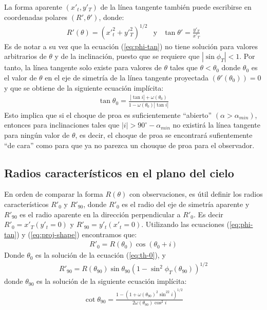La forma aparente $(x'_t, y'_T)$  de la línea tangente también puede escribirse
en coordenadas polares $(R', \theta')$, donde:
\begin{align}
  R'(\theta) = \left(x'_t^2 + y'_T^2\right)^{1/2} & \mathrm{y} & \tan\theta' = \frac{y'_T}{x'_T}
  \label{eq:polar}
\end{align}
Es de notar a su vez que la ecuación (\ref{eq:phi-tan}) no tiene solución para valores
arbitrarios de $\theta$ y de la inclinación, puesto que se requiere que
$\left|\sin\phi_T\right| < 1$. Por tanto, la línea tangente solo existe para valores
de $\theta$ tales que $\theta < \theta_0$ donde $\theta_0$ es el valor de $\theta$ en
el eje de simetría de la línea tangente proyectada $(\theta'(\theta_0)) = 0$ y que se
obtiene de la siguiente ecuación implícita:
\begin{align}
  \tan\theta_0 = \frac{|\tan i| + \omega(\theta_0)}{1 - \omega(\theta_0)|\tan i|}
  \label{eq:th-0}
\end{align}
Esto implica que si el choque de proa es suficientemente ``abierto''
$(\alpha > \alpha_{min})$, entonces para inclinaciones tales que
$|i| > 90^\circ - \alpha_{min}$ no existirá la línea tangente para ningún valor de $\theta$,
es decir, el choque de proa se encontrará sufientemente ``de cara'' como para que ya no
parezca un chouque de proa para el observador.

\subsection{Radios característicos en el plano del cielo}

En orden de comparar la forma $R(\theta)$ con observaciones, es útil definir los radios
característicos $R'_0$ y $R'_{90}$, donde $R'_0$ es el radio del eje de simetría aparente
y $R'_{90}$ es el radio aparente en la dirección perpendicular a $R'_0$. Es decir
$R'_0 = x'_T(y'_t=0)$ y $R'_{90} = y'_t(x'_t = 0)$. Utilizando las ecuaciones
(\ref{eq:phi-tan}) y (\ref{eq:proj-shape}) encontramos que:
\begin{align}
R'_0 = R(\theta_0)\cos(\theta_0 + i)
\label{eq:R0p}
\end{align}
Donde $\theta_0$ es la solución de la ecuación (\ref{eq:th-0}), y
\begin{align}
  R'_{90} = R(\theta_{90})\sin\theta_{90}\left(1-\sin^2\phi_T(\theta_{90})\right)^{1/2}
  \label{eq:R90p}
\end{align}
donde $\theta_{90}$ es la solución de la siguiente ecuación implícita:
\begin{align}
  \cot\theta_{90} = \frac{1 - \left(1+\omega(\theta_{90})^2\sin^22i\right)^{1/2}}
  {2\omega(\theta_{90})\cos^2i}
  \label{eq:th90}
\end{align}

